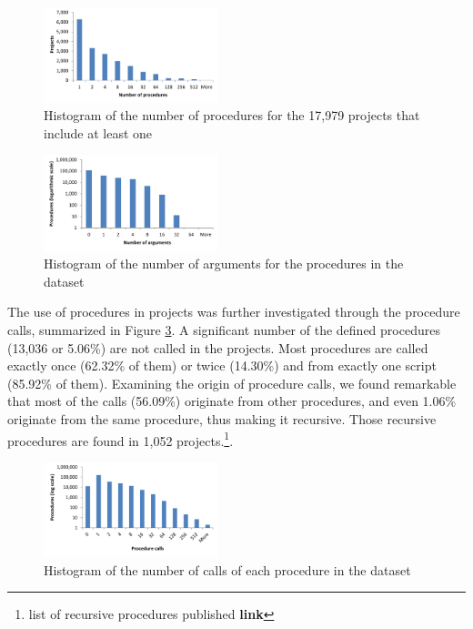 \documentclass{sig-alternate}
\newcommand{\todo}[1]{\textbf{#1}}
\begin{document}
\begin{figure}
	\centering
	\includegraphics[width=0.45\textwidth]{fig/charts/6proceduresperproject}
	\caption{Histogram of the number of procedures for the 17,979 projects that include at least one}
	\label{fig:proceduresperproject}
\end{figure}

\begin{figure}
	\centering
	\includegraphics[width=0.45\textwidth]{fig/charts/5arguments}
	\caption{Histogram of the number of arguments for the procedures in the dataset}
	\label{fig:procedurearguments}
\end{figure}

The use of procedures in projects was further investigated through the procedure calls, summarized in Figure \ref{fig:procedurecalls}. A significant number of the defined procedures (13,036 or 5.06\%) are not called in the projects. Most procedures are called exactly once (62.32\% of them) or twice (14.30\%) and from exactly one script (85.92\% of them). Examining the origin of procedure calls, we found remarkable that most of the calls (56.09\%) originate from other procedures, and even 1.06\% originate from the same procedure, thus making it recursive. Those recursive procedures are found in 1,052 projects.\footnote{list of recursive procedures published \todo{link}}.

\begin{figure}
	\centering
	\includegraphics[width=0.45\textwidth]{fig/charts/7procedurecalls}
	\caption{Histogram of the number of calls of each procedure in the dataset}
	\label{fig:procedurecalls}
\end{figure}
\end{document}
